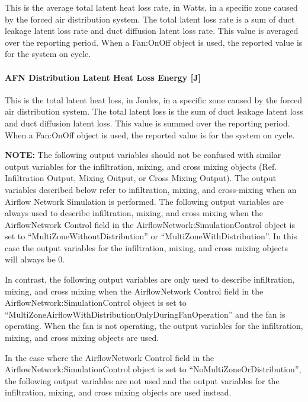 This is the average total latent heat loss rate, in Watts, in a specific zone caused by the forced air distribution system. The total latent loss rate is a sum of duct leakage latent loss rate and duct diffusion latent loss rate. This value is averaged over the reporting period. When a Fan:OnOff object is used, the reported value is for the system on cycle.

\paragraph{AFN Distribution Latent Heat Loss Energy {[}J{]}}\label{afn-distribution-latent-heat-loss-energy-j}

This is the total latent heat loss, in Joules, in a specific zone caused by the forced air distribution system. The total latent loss is the sum of duct leakage latent loss and duct diffusion latent loss. This value is summed over the reporting period. When a Fan:OnOff object is used, the reported value is for the system on cycle.

\textbf{NOTE:} The following output variables should not be confused with similar output variables for the infiltration, mixing, and cross mixing objects (Ref. Infiltration Output, Mixing Output, or Cross Mixing Output). The output variables described below refer to infiltration, mixing, and cross-mixing when an Airflow Network Simulation is performed. The following output variables are always used to describe infiltration, mixing, and cross mixing when the AirflowNetwork Control field in the AirflowNetwork:SimulationControl object is set to ``MultiZoneWithoutDistribution'' or ``MultiZoneWithDistribution''. In this case the output variables for the infiltration, mixing, and cross mixing objects will always be 0.

In contrast, the following output variables are only used to describe infiltration, mixing, and cross mixing when the AirflowNetwork Control field in the AirflowNetwork:SimulationControl object is set to ``MultiZoneAirflowWithDistributionOnlyDuringFanOperation'' and the fan is operating. When the fan is not operating, the output variables for the infiltration, mixing, and cross mixing objects are used.

In the case where the AirflowNetwork Control field in the AirflowNetwork:SimulationControl object is set to ``NoMultiZoneOrDistribution'', the following output variables are not used and the output variables for the infiltration, mixing, and cross mixing objects are used instead.

